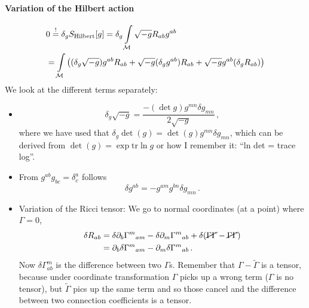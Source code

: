 \paragraph{Variation of the Hilbert action}
\begin{align*}
    &0 \stackrel{!}{=} \delta_g S_\text{Hilbert}[g] = \delta_g \int\limits_{\mathcal{M}} \sqrt{-g} R_{ab}g^{ab}\\
    &= \int\limits_{\mathcal{M}} \left( (\delta_g\sqrt{-g}) g^{ab} R_{ab} + \sqrt{-g} (\delta_g g^{ab}) R_{ab}
    + \sqrt{-g} g^{ab} (\delta_g R_{ab})\right)
\end{align*}
We look at the different terms separately:
\begin{itemize}
    \item 
        \begin{equation}
            \delta_g\sqrt{-g} = \frac{- (\det g) g^{mn}\delta g_{mn}}{2 \sqrt{-g}}\,,
        \end{equation}
        where we have used that $\delta_g \det(g) = \det(g) g^{mn}\delta g_{mn}$,
        which can be derived from $\det(g) = \exp \mathrm{tr} \ln g$ or how I remember it:
        ``ln det = trace log''.
    \item 
        From $g^{ab}g_{bc} = \delta^a_c$ follows
        \begin{equation}
            \delta g^{ab} = - g^{am} g^{bn} \delta g_{mn}\,.
        \end{equation}
    \item Variation of the Ricci tensor:
        We go to normal coordinates (at a point) where $\Gamma = 0$,
        \begin{align*}
            \delta R_{ab} &= \delta \partial_b \Gamma^m{}_{am} -
            \delta \partial_m \Gamma^m{}_{ab} + \delta(\cancel{\Gamma\Gamma} - \cancel{\Gamma\Gamma})\\
            &= \partial_b \delta \Gamma^{m}{}_{am} - \partial_m \delta \Gamma^m{}_{ab}\,.
        \end{align*}
        Now $\delta \Gamma^m_{ab}$ is the difference between two $\Gamma$s.
        Remember that $\Gamma - \tilde{\Gamma}$ is a tensor, because under coordinate transformation
        $\Gamma$ picks up a wrong term ($\Gamma$ is no tensor),
        but $\tilde\Gamma$ pics up the same term and so those cancel and the difference between
        two connection coefficients is a tensor.


\end{itemize}
